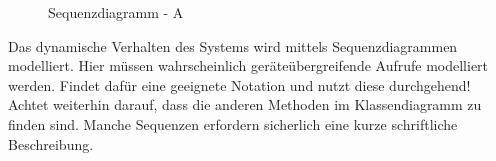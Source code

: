 \begin{figure}[h]
	\centering
	\caption{Sequenzdiagramm - A}
	\label{fig:sequenz-a}
\end{figure}


\begin{tcolorbox}
Das dynamische Verhalten des Systems wird mittels Sequenzdiagrammen modelliert.
Hier müssen wahrscheinlich geräteübergreifende Aufrufe modelliert werden.
Findet dafür eine geeignete Notation und nutzt diese durchgehend! 
Achtet weiterhin darauf, dass die anderen Methoden im Klassendiagramm zu finden sind.
Manche Sequenzen erfordern sicherlich eine kurze schriftliche Beschreibung.
\end{tcolorbox}


